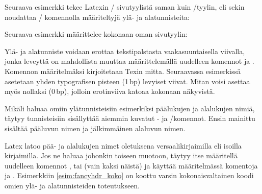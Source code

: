 Seuraava esimerkki tekee Latexin \-/ sivutyylistä saman
kuin \-/tyylin, eli sekin noudattaa \-/
komennolla määriteltyjä ylä- ja alatunnisteita:

\begin{koodilohkosis}
\end{koodilohkosis}

Seuraava esimerkki määrittelee kokonaan oman sivutyylin:

\begin{koodilohkosis}
\end{koodilohkosis}

Ylä- ja alatunniste voidaan erottaa tekstipalstasta vaakasuuntaisella
viivalla, jonka leveyttä on mahdollista muuttaa määrittelemällä
uudelleen komennot  ja .
Komennon määritelmäksi kirjoitetaan Texin mitta. Seuraavassa esimerkissä
asetetaan yhden typografisen pisteen (1\,bp) levyiset viivat. Mitan
voisi asettaa myös nollaksi (0\,bp), jolloin erotinviiva katoaa kokonaan
näkyvistä.

\begin{koodilohkosis}
\renewcommand{\headrulewidth}{1bp} %
\renewcommand{\footrulewidth}{1bp} %
\end{koodilohkosis}

Mikäli haluaa omiin ylätunnisteisiin esimerkiksi päälukujen ja
alalukujen nimiä, täytyy tunnisteisiin sisällyttää aiemmin kuvatut
- ja \-/komennot. Ensin mainittu
sisältää pääluvun nimen ja jälkimmäinen alaluvun nimen.

\begin{koodilohkosis}
\fancyhf[HEL]{\leftmark}
\fancyhf[HOR]{\rightmark}
\end{koodilohkosis}

Latex latoo pää- ja alalukujen nimet oletuksena versaalikirjaimilla eli
isoilla kirjaimilla. Jos ne haluaa johonkin toiseen muotoon, täytyy itse
määritellä uudelleen komennot ,
 tai  (vain kaksi näistä)
ja käyttää määritelmässä komentoja  ja
. Esimerkkiin \ref{esim:fancyhdr_koko} on koottu
varsin kokonaisvaltainen koodi omien ylä- ja alatunnisteiden
toteutukseen.


